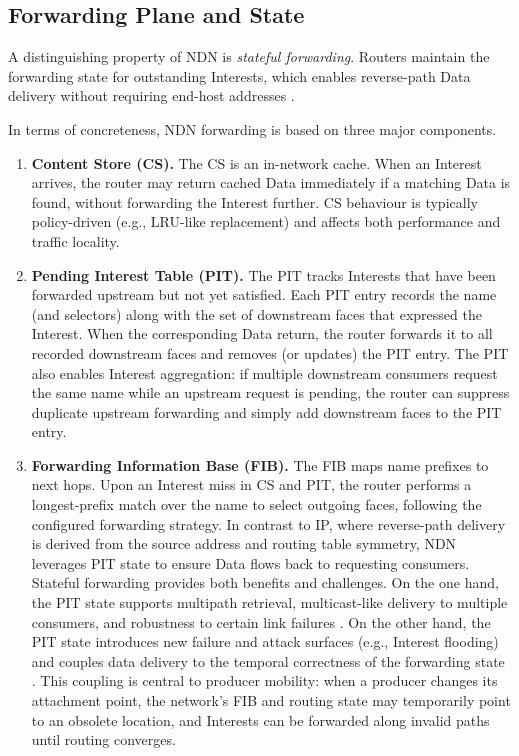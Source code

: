 \subsection{Forwarding Plane and State}
A distinguishing property of NDN is \emph{stateful forwarding}. Routers maintain the forwarding state for outstanding Interests, which enables reverse-path Data delivery without requiring end-host addresses \cite{yi:2013:stateful-forwarding}.

In terms of concreteness, NDN forwarding is based on three major components.

\begin{enumerate}
    \item \textbf{Content Store (CS).} The CS is an in-network cache. When an Interest arrives, the router may return cached Data immediately if a matching Data is found, without forwarding the Interest further. CS behaviour is typically policy-driven (e.g., LRU-like replacement) and affects both performance and traffic locality.
    \item \textbf{Pending Interest Table (PIT).} The PIT tracks Interests that have been forwarded upstream but not yet satisfied. Each PIT entry records the name (and selectors) along with the set of downstream faces that expressed the Interest. When the corresponding Data return, the router forwards it to all recorded downstream faces and removes (or updates) the PIT entry. The PIT also enables Interest aggregation: if multiple downstream consumers request the same name while an upstream request is pending, the router can suppress duplicate upstream forwarding and simply add downstream faces to the PIT entry.
    \item \textbf{Forwarding Information Base (FIB).} The FIB maps name prefixes to next hops. Upon an Interest miss in CS and PIT, the router performs a longest-prefix match over the name to select outgoing faces, following the configured forwarding strategy. In contrast to IP, where reverse-path delivery is derived from the source address and routing table symmetry, NDN leverages PIT state to ensure Data flows back to requesting consumers. Stateful forwarding provides both benefits and challenges. On the one hand, the PIT state supports multipath retrieval, multicast-like delivery to multiple consumers, and robustness to certain link failures \cite{yi:2013:stateful-forwarding}. On the other hand, the PIT state introduces new failure and attack surfaces (e.g., Interest flooding) and couples data delivery to the temporal correctness of the forwarding state \cite{afanasyev:2013:interest-flooding}. This coupling is central to producer mobility: when a producer changes its attachment point, the network's FIB and routing state may temporarily point to an obsolete location, and Interests can be forwarded along invalid paths until routing converges.
\end{enumerate}

